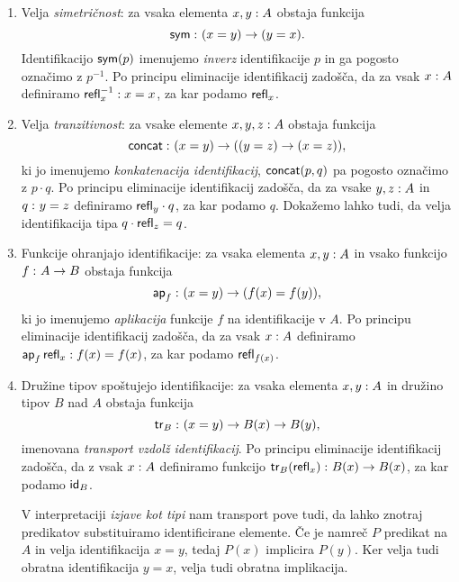 \begin{enumerate}
\item Velja \emph{simetričnost}: za vsaka elementa \(x, y : A\) obstaja
  funkcija \[\textnormal{\textsf{sym}} \,\colon (x = y) \to (y = x).\] Identifikacijo \(\textnormal{\textsf{sym}}(p)\)
  imenujemo \emph{inverz} identifikacije \(p\) in ga pogosto označimo z \(p^{-1}\).
  Po principu eliminacije identifikacij zadošča, da za vsak \(x : A\) definiramo \(\textnormal{\textsf{refl}}_{x}^{-1} : x = x\), za kar podamo \(\textnormal{\textsf{refl}}_{x}\).
\item Velja \emph{tranzitivnost}: za vsake elemente \(x, y, z : A\) obstaja
  funkcija \[\textnormal{\textsf{concat}} \,\colon (x = y) \to ((y = z) \to (x = z)),\] ki jo imenujemo
  \emph{konkatenacija identifikacij}, \(\textnormal{\textsf{concat}}(p, q)\) pa pogosto označimo
  z \(p \cdot q\). Po principu eliminacije identifikacij zadošča, da za vsake \(y, z : A\) in \(q \,\colon y = z\) definiramo \(\textnormal{\textsf{refl}}_{y}\cdot q\), za kar podamo \(q\). Dokažemo lahko tudi, da velja identifikacija tipa \(q \cdot \textnormal{\textsf{refl}}_{z} = q\).
\item Funkcije ohranjajo identifikacije: za vsaka elementa \(x, y : A\)
  in vsako funkcijo \(f \,\colon A \to B\) obstaja funkcija
  \[\textnormal{\textsf{ap}}_{f} \,\colon (x = y) \to (f(x) = f(y)),\]
  ki jo imenujemo \emph{aplikacija} funkcije \(f\) na identifikacije v \(A\). Po principu eliminacije identifikacij zadošča, da za vsak \(x : A\) definiramo
  \(\textnormal{\textsf{ap}}_{f}\,\textnormal{\textsf{refl}}_{x} : f(x) = f(x)\), za kar podamo \(\textnormal{\textsf{refl}}_{f(x)}\).
\item Družine tipov spoštujejo identifikacije: za vsaka elementa
  \(x, y : A\) in družino tipov
  \(B\) nad \(A\) obstaja funkcija
  \[\textnormal{\textsf{tr}}_{B} \,\colon (x = y) \to B(x) \to B(y),\]
  imenovana \emph{transport vzdolž identifikacij}.
  Po principu eliminacije identifikacij zadošča, da z vsak \(x : A\) definiramo funkcijo \(\textnormal{\textsf{tr}}_{B}(\textnormal{\textsf{refl}}_{x}) \,\colon B(x) \to B(x)\), za kar podamo \(\textnormal{\textsf{id}}_{B}\).

  V interpretaciji \emph{izjave kot tipi} nam transport pove tudi, da lahko znotraj
  predikatov substituiramo identificirane elemente. Če je namreč \(P\) predikat
  na \(A\) in velja identifikacija \(x = y\), tedaj \(P(x)\) implicira \(P(y)\). Ker velja tudi obratna identifikacija \(y = x\), velja tudi obratna implikacija.
\end{enumerate}

